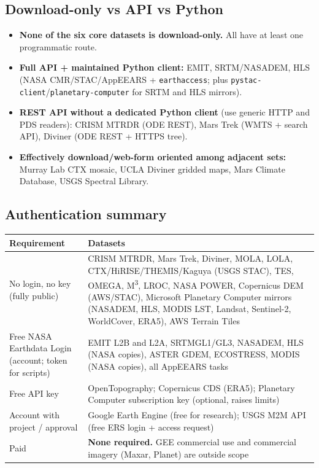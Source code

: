 \documentclass[10pt,a4paper]{article}
\begin{document}
\subsection{Download-only vs API vs Python}
\begin{itemize}
\item \textbf{None of the six core datasets is download-only.} All have at least one programmatic route.
\item \textbf{Full API + maintained Python client:} EMIT, SRTM/NASADEM, HLS (NASA CMR/STAC/AppEEARS + \texttt{earthaccess}; plus \texttt{pystac-client}/\texttt{planetary-computer} for SRTM and HLS mirrors).
\item \textbf{REST API without a dedicated Python client} (use generic HTTP and PDS readers): CRISM MTRDR (ODE REST), Mars Trek (WMTS + search API), Diviner (ODE REST + HTTPS tree).
\item \textbf{Effectively download/web-form oriented among adjacent sets:} Murray Lab CTX mosaic, UCLA Diviner gridded maps, Mars Climate Database, USGS Spectral Library.
\end{itemize}

\subsection{Authentication summary}
{\small{}
\begin{tabularx}{\textwidth}{@{}>{\raggedright\arraybackslash}p{4.5cm}L@{}}
\toprule\textbf{Requirement} & \textbf{Datasets}\\\midrule
No login, no key (fully public) & CRISM MTRDR, Mars Trek, Diviner, MOLA, LOLA, CTX/HiRISE/THEMIS/Kaguya (USGS STAC), TES, OMEGA, M\textsuperscript{3}, LROC, NASA POWER, Copernicus DEM (AWS/STAC), Microsoft Planetary Computer mirrors (NASADEM, HLS, MODIS LST, Landsat, Sentinel-2, WorldCover, ERA5), AWS Terrain Tiles\\
Free NASA Earthdata Login (account; token for scripts) & EMIT L2B and L2A, SRTMGL1/GL3, NASADEM, HLS (NASA copies), ASTER GDEM, ECOSTRESS, MODIS (NASA copies), all AppEEARS tasks\\
Free API key & OpenTopography; Copernicus CDS (ERA5); Planetary Computer subscription key (optional, raises limits)\\
Account with project / approval & Google Earth Engine (free for research); USGS M2M API (free ERS login + access request)\\
Paid & \textbf{None required.} GEE commercial use and commercial imagery (Maxar, Planet) are outside scope\\
\bottomrule
\end{tabularx}}
\end{document}
